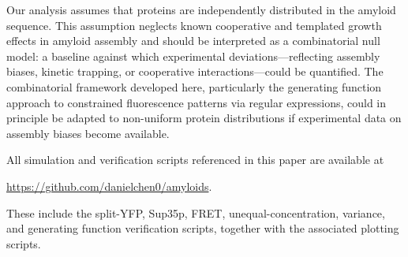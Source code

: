 \documentclass[11pt]{article}
\begin{document}
Our analysis assumes that proteins are independently distributed in the amyloid sequence. This assumption neglects known cooperative and templated growth effects in amyloid assembly \cite{chiti2006} and should be interpreted as a combinatorial null model: a baseline against which experimental deviations---reflecting assembly biases, kinetic trapping, or cooperative interactions---could be quantified. The combinatorial framework developed here, particularly the generating function approach to constrained fluorescence patterns via regular expressions, could in principle be adapted to non-uniform protein distributions if experimental data on assembly biases become available.

All simulation and verification scripts referenced in this paper are available at
\begin{center}
\url{https://github.com/danielchen0/amyloids}.
\end{center}
These include the split-YFP, Sup35p, FRET, unequal-concentration, variance, and
generating function verification scripts, together with the associated plotting scripts.



\end{document}
